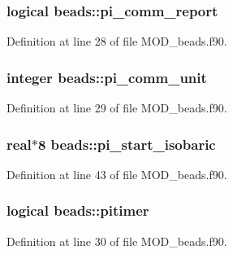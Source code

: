 \hypertarget{classbeads_a0d974936f1ea3d107942bc5c6a0ccffb}{
\subsubsection[{pi\-\_\-comm\-\_\-report}]{\setlength{\rightskip}{0pt plus 5cm}logical beads\-::pi\-\_\-comm\-\_\-report}}\label{classbeads_a0d974936f1ea3d107942bc5c6a0ccffb}


Definition at line 28 of file M\-O\-D\-\_\-beads.\-f90.

\hypertarget{classbeads_a1101fc1a583313a5a1d66a43d80e6c3f}{
\subsubsection[{pi\-\_\-comm\-\_\-unit}]{\setlength{\rightskip}{0pt plus 5cm}integer beads\-::pi\-\_\-comm\-\_\-unit}}\label{classbeads_a1101fc1a583313a5a1d66a43d80e6c3f}


Definition at line 29 of file M\-O\-D\-\_\-beads.\-f90.

\hypertarget{classbeads_a59d4fa81e053b17dd0c14e73973ccb3a}{
\subsubsection[{pi\-\_\-start\-\_\-isobaric}]{\setlength{\rightskip}{0pt plus 5cm}real$\ast$8 beads\-::pi\-\_\-start\-\_\-isobaric}}\label{classbeads_a59d4fa81e053b17dd0c14e73973ccb3a}


Definition at line 43 of file M\-O\-D\-\_\-beads.\-f90.

\hypertarget{classbeads_a7347e75d7715131be1ef685b82104fe5}{
\subsubsection[{pitimer}]{\setlength{\rightskip}{0pt plus 5cm}logical beads\-::pitimer}}\label{classbeads_a7347e75d7715131be1ef685b82104fe5}


Definition at line 30 of file M\-O\-D\-\_\-beads.\-f90.

